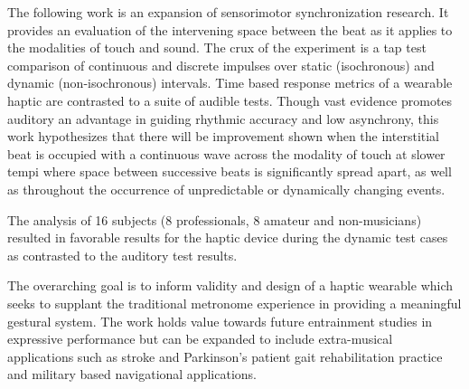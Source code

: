 
\setlength{\parskip}{1em}
\setlength{\parindent}{0em}

\noindent

The following work is an expansion of sensorimotor synchronization research. It provides an evaluation of the intervening space between the beat as it applies to the modalities of touch and sound. The crux of the experiment is a tap test comparison of continuous and discrete impulses over static (isochronous) and dynamic (non-isochronous) intervals. Time based response metrics of a wearable haptic are contrasted to a suite of audible tests. Though vast evidence promotes auditory an advantage in guiding rhythmic accuracy and low asynchrony, this work hypothesizes that there will be improvement shown when the interstitial beat is occupied with a continuous wave across the modality of touch at slower tempi where space between successive beats is significantly spread apart, as well as throughout the occurrence of unpredictable or dynamically changing events. 

The analysis of 16 subjects (8 professionals, 8 amateur and non-musicians) resulted in favorable results for the haptic device during the dynamic test cases as contrasted to the auditory test results.


The overarching goal is to inform validity and design of a haptic wearable which seeks to supplant the traditional metronome experience in providing a meaningful gestural system. The work holds value towards future entrainment studies in expressive performance but can be expanded to include extra-musical applications such as stroke and Parkinson's patient gait rehabilitation practice and military based navigational applications.
